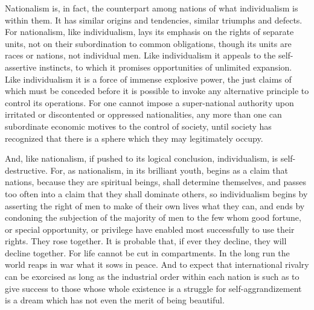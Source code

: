 \documentclass{book}
\begin{document}
Nationalism is, in fact, the counterpart among nations of what individualism is within them. It has similar origins and tendencies, similar triumphs and defects. For nationalism, like individualism, lays its emphasis on the rights of separate units, not on their subordination to common obligations, though its units are races or nations, not individual men. Like individualism it appeals to the self-assertive instincts, to which it promises opportunities of unlimited expansion. Like individualism it is a force of immense explosive power, the just claims of which must be conceded before it is possible to invoke any alternative principle to control its operations. For one cannot impose a super-national authority upon irritated or discontented or oppressed nationalities, any more than one can subordinate economic motives to the control of society, until society has recognized that there is a sphere which they may legitimately occupy.

And, like nationalism, if pushed to its logical conclusion, individualism, is self-destructive. For, as nationalism, in its brilliant youth, begins as a claim that nations, because they are spiritual beings, shall determine themselves, and passes too often into a claim that they shall dominate others, so individualism begins by asserting the right of men to make of their own lives what they can, and ends by condoning the subjection of the majority of men to the few whom good fortune, or special opportunity, or privilege have enabled most successfully to use their rights. They rose together. It is probable that, if ever they decline, they will decline together. For life cannot be cut in compartments. In the long run the world reaps in war what it sows in peace. And to expect that international rivalry can be exorcised as long as the industrial order within each nation is such as to give success to those whose whole existence is a struggle for self-aggrandizement is a dream which has not even the merit of being beautiful.
\end{document}
